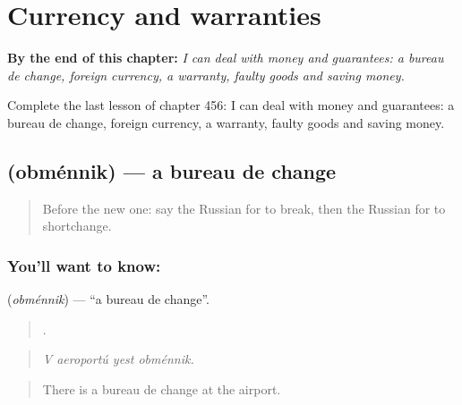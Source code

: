 
\chapter{Currency and warranties}
\label{ch:ru-currency-and-warranties}

\begin{chapteropening}
\textbf{By the end of this chapter:} \emph{I can deal with money and guarantees: a bureau de change, foreign currency, a warranty, faulty goods and saving money.}

Complete the last lesson of chapter 456: I can deal with money and guarantees: a bureau de change, foreign currency, a warranty, faulty goods and saving money.
\end{chapteropening}

\section[\texorpdfstring{\ru{обменник} (obménnik)}{обменник (obménnik)}]{ (obménnik) — a bureau de change}

\label{lesson:RU-C456-obmennik}



\begin{quote}
Before the new one: say the Russian for to break, then the Russian for to shortchange.
\end{quote}

\subsection*{You'll want to know: }
\textbf{} (\emph{obménnik}) — \textquotedblleft{}a bureau de change\textquotedblright{}.

\begin{quote}
   .
\end{quote}

\begin{quote}
\emph{V aeroportú yest obménnik.}
\end{quote}

\begin{quote}
There is a bureau de change at the airport.
\end{quote}

